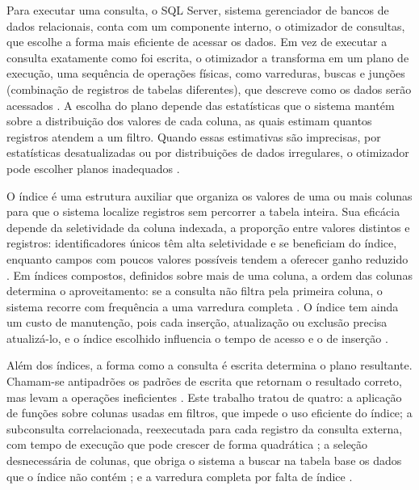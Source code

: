Para executar uma consulta, o SQL Server, sistema gerenciador de bancos de dados relacionais, conta com um componente interno, o otimizador de consultas, que escolhe a forma mais eficiente de acessar os dados. Em vez de executar a consulta exatamente como foi escrita, o otimizador a transforma em um plano de execução, uma sequência de operações físicas, como varreduras, buscas e junções (combinação de registros de tabelas diferentes), que descreve como os dados serão acessados \cite{fritchey2018plans}. A escolha do plano depende das estatísticas que o sistema mantém sobre a distribuição dos valores de cada coluna, as quais estimam quantos registros atendem a um filtro. Quando essas estimativas são imprecisas, por estatísticas desatualizadas ou por distribuições de dados irregulares, o otimizador pode escolher planos inadequados \cite{leis2015good, han2022cardest}.

O índice é uma estrutura auxiliar que organiza os valores de uma ou mais colunas para que o sistema localize registros sem percorrer a tabela inteira. Sua eficácia depende da seletividade da coluna indexada, a proporção entre valores distintos e registros: identificadores únicos têm alta seletividade e se beneficiam do índice, enquanto campos com poucos valores possíveis tendem a oferecer ganho reduzido \cite{fritchey2018qpt}. Em índices compostos, definidos sobre mais de uma coluna, a ordem das colunas determina o aproveitamento: se a consulta não filtra pela primeira coluna, o sistema recorre com frequência a uma varredura completa \cite{fritchey2018qpt}. O índice tem ainda um custo de manutenção, pois cada inserção, atualização ou exclusão precisa atualizá-lo, e o índice escolhido influencia o tempo de acesso e o de inserção \cite{saidu2024indexing}.

Além dos índices, a forma como a consulta é escrita determina o plano resultante. Chamam-se antipadrões os padrões de escrita que retornam o resultado correto, mas levam a operações ineficientes \cite{karwin2010antipatterns}. Este trabalho tratou de quatro: a aplicação de funções sobre colunas usadas em filtros, que impede o uso eficiente do índice; a subconsulta correlacionada, reexecutada para cada registro da consulta externa, com tempo de execução que pode crescer de forma quadrática \cite{neumann2025unnesting}; a seleção desnecessária de colunas, que obriga o sistema a buscar na tabela base os dados que o índice não contém \cite{karwin2010antipatterns, fritchey2018qpt}; e a varredura completa por falta de índice \cite{fritchey2018qpt}.

